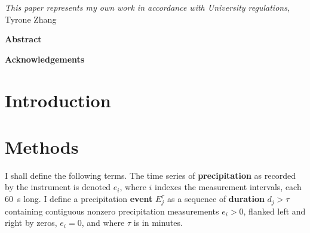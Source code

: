 \documentclass[11pt]{report}
\begin{document}



\thispagestyle{empty}
\vspace*{3in}
\begin{center}
\emph{This paper represents my own work in accordance with University regulations,} \\
Tyrone Zhang %
\end{center}
\clearpage

\begin{center}
\Large \textbf{Abstract}
\end{center}
 
 \clearpage

\begin{center}
\Large \textbf{Acknowledgements}
\end{center}

\clearpage

\thispagestyle{empty}
\tableofcontents
\clearpage

\listoffigures 
\listoftables
\clearpage

\fancyhead{}
\fancyfoot{}
\pagestyle{fancyplain}

{\newpage\renewcommand{\thepage}{\arabic{page}}\setcounter{page}{1}}


\section{Introduction \label{sec:introduction}}

% 

\section{Methods \label{sec:methods}}

I shall define the following terms. The time series of
\textbf{precipitation} as recorded by the instrument is denoted $e_i$,
where $i$ indexes the measurement intervals, each 60~s long. I define
a precipitation \textbf{event} $E_j^\tau $ as a sequence of
\textbf{duration} $d_j>\tau$ containing contiguous nonzero
precipitation measurements $e_i>0$, flanked left and right by zeros,
$e_i=0$, and where $\tau$ is in minutes.
\end{document}
